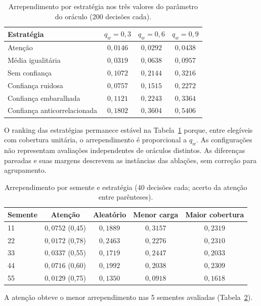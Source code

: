 \begin{table}[htbp]
\fontsize{10}{12}\selectfont\SingleSpacing
\centering
\caption{Arrependimento por estratégia nos três valores do parâmetro do oráculo (200 decisões cada).}
\label{tab:mundos}
\begin{tabular}{lccc}
\toprule
Estratégia & $q_w=0{,}3$ & $q_w=0{,}6$ & $q_w=0{,}9$ \\
\midrule
Atenção & $0{,}0146$ & $0{,}0292$ & $0{,}0438$ \\
Média igualitária & $0{,}0319$ & $0{,}0638$ & $0{,}0957$ \\
Sem confiança & $0{,}1072$ & $0{,}2144$ & $0{,}3216$ \\
Confiança ruidosa & $0{,}0757$ & $0{,}1515$ & $0{,}2272$ \\
Confiança embaralhada & $0{,}1121$ & $0{,}2243$ & $0{,}3364$ \\
Confiança anticorrelacionada & $0{,}1802$ & $0{,}3604$ & $0{,}5406$ \\
\bottomrule
\end{tabular}
\end{table}
O ranking das estratégias permanece estável na Tabela~\ref{tab:mundos} porque, entre elegíveis com cobertura unitária, o arrependimento é proporcional a $q_w$. As configurações não representam avaliações independentes de oráculos distintos. As diferenças pareadas e suas margens descrevem as instâncias das ablações, sem correção para agrupamento.
\begin{table}[htbp]
\fontsize{10}{12}\selectfont\SingleSpacing
\centering
\caption{Arrependimento por semente e estratégia (40 decisões cada; acerto da atenção entre parênteses).}
\label{tab:seeds}
\begin{tabular}{lcccc}
\toprule
Semente & Atenção & Aleatório & Menor carga & Maior cobertura \\
\midrule
11 & $0{,}0752$ (0,45) & $0{,}1889$ & $0{,}3157$ & $0{,}2319$ \\
22 & $0{,}0172$ (0,78) & $0{,}2463$ & $0{,}2276$ & $0{,}2310$ \\
33 & $0{,}0337$ (0,55) & $0{,}1719$ & $0{,}2447$ & $0{,}2033$ \\
44 & $0{,}0716$ (0,60) & $0{,}1992$ & $0{,}2038$ & $0{,}2309$ \\
55 & $0{,}0129$ (0,75) & $0{,}1350$ & $0{,}0918$ & $0{,}1618$ \\
\bottomrule
\end{tabular}
\end{table}
A atenção obteve o menor arrependimento nas 5 sementes avaliadas (Tabela~\ref{tab:seeds}).
